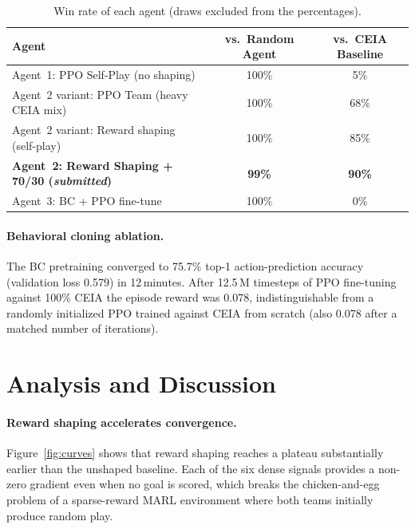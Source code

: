 \documentclass{article}
\begin{document}
\begin{table}[h]
\centering\small
\caption{Win rate of each agent (draws excluded from the percentages).}
\label{tab:results}
\begin{tabular}{l c c}
\toprule
Agent & vs.\ Random Agent & vs.\ CEIA Baseline \\
\midrule
Agent~1: PPO Self-Play (no shaping)            & 100\% & 5\% \\
Agent~2 variant: PPO Team (heavy CEIA mix)     & 100\% & 68\% \\
Agent~2 variant: Reward shaping (self-play)    & 100\% & 85\% \\
\textbf{Agent~2: Reward Shaping + 70/30 (\textit{submitted})} & \textbf{99\%} & \textbf{90\%} \\
Agent~3: BC + PPO fine-tune                    & 100\% & 0\% \\
\bottomrule
\end{tabular}
\end{table}

\paragraph{Behavioral cloning ablation.}
The BC pretraining converged to 75.7\% top-1 action-prediction accuracy
(validation loss 0.579) in 12\,minutes. After 12.5\,M timesteps of PPO fine-tuning
against 100\% CEIA the episode reward was 0.078, indistinguishable from a
randomly initialized PPO trained against CEIA from scratch (also 0.078 after a
matched number of iterations).

\section{Analysis and Discussion}
\label{sec:analysis}

\paragraph{Reward shaping accelerates convergence.}
Figure~\ref{fig:curves} shows that reward shaping reaches a plateau substantially
earlier than the unshaped baseline. Each of the six dense signals provides a non-zero
gradient even when no goal is scored, which breaks the chicken-and-egg problem of a
sparse-reward MARL environment where both teams initially produce random play.
\end{document}
